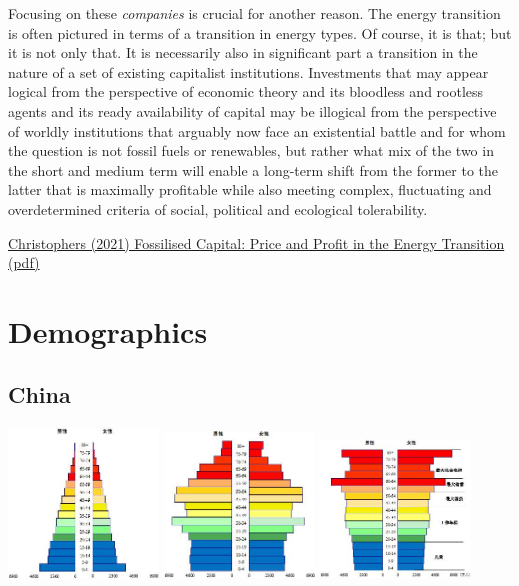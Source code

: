 \documentclass[
]{book}
\begin{document}
Focusing on these \emph{companies} is crucial for another reason. The energy transition is often pictured in
terms of a transition in energy types. Of course, it is that; but it is not only that. It is necessarily also in
signiﬁcant part a transition in the nature of a set of existing capitalist institutions. Investments that may
appear logical from the perspective of economic theory and its bloodless and rootless agents and its
ready availability of capital may be illogical from the perspective of worldly institutions that arguably
now face an existential battle and for whom the question is not fossil fuels or renewables, but rather
what mix of the two in the short and medium term will enable a long-term shift from the former to the
latter that is maximally proﬁtable while also meeting complex, ﬂuctuating and overdetermined criteria
of social, political and ecological tolerability.

\href{https://www.tandfonline.com/doi/epub/10.1080/13563467.2021.1926957}{Christophers (2021) Fossilised Capital: Price and Profit in the Energy Transition}
\href{pdf/Christophers_2021_Fossilised_Capital_Transition.pdf}{(pdf)}

\hypertarget{demographics}{%
\chapter{Demographics}\label{demographics}}

\hypertarget{china}{%
\section{China}\label{china}}

\includegraphics[width=0.3\textwidth,height=\textheight]{fig/china_demographics_1950.png}
\includegraphics[width=0.3\textwidth,height=\textheight]{fig/china_demographics_2019.png}
\includegraphics[width=0.3\textwidth,height=\textheight]{fig/china_demographics_2050.png}
\end{document}
